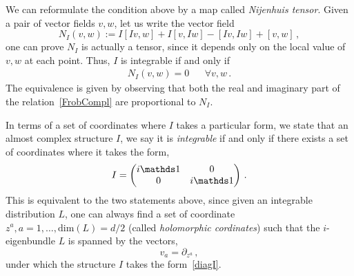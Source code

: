 \documentclass[debug]{phd}
\begin{document}
						We can reformulate the condition above by a map called \emph{Nijenhuis tensor}.
						Given a pair of vector fields $v, w$, let us write the vector field
								\begin{equation}\label{nijten}
									N_I(v,w) := I \left[ I v, w \right] + I \left[ v, I w \right] - \left[ I v, I w \right] + \left[  v, w \right]\, ,
								\end{equation}
						one can prove $N_I$ is actually a tensor, since it depends only on the local value of $v, w$ at each point.
						Thus, $I$ is integrable if and only if
								\begin{align*}
									& & N_I(v,w) = 0 & &  \forall v, w\, .& &
								\end{align*}
						The equivalence is given by observing that both the real and imaginary part of the relation~\eqref{FrobCompl} are proportional to $N_I$.

						In terms of a set of coordinates where $I$ takes a particular form, we state that an almost complex structure $I$, we say it is \emph{integrable} if and only if there exists a set of coordinates where it takes the form,
								\begin{equation}
								\label{diagI}
									I =	\begin{pmatrix}
											i \id	&		0		\\
												0		&	i \id	\\
										\end{pmatrix} \, .
								\end{equation}
						This is equivalent to the two statements above, since given an integrable distribution $L$, one can always find a set of coordinate $z^a, a= 1, \ldots, \mathrm{dim}(L) = d/2$ (called \emph{holomorphic cordinates}) such that the $i$-eigenbundle $L$ is spanned by the vectors,
								\begin{equation}
									v_a = \partial_{z^a} \, ,
								\end{equation}
						under which the structure $I$ takes the form~\eqref{diagI}.
						
\end{document}
